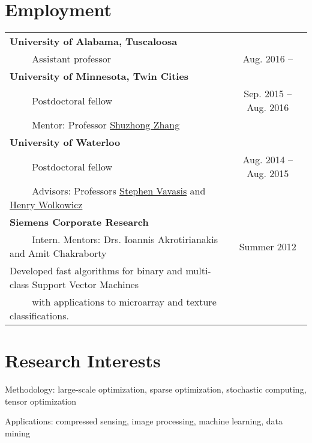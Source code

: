 \documentclass[letterpaper]{article}
\renewenvironment{itemize}{
  \begin{list}{}{
    \setlength{\leftmargin}{1.5em}
  }
}{
  \end{list}
}
\begin{document}
\section*{Employment}

\begin{minipage}{1\linewidth}
\begin{tabular}{lc}
\textbf{University of Alabama, Tuscaloosa}&\\
~~~~ Assistant professor & Aug. 2016 --\\
\textbf{University of Minnesota, Twin Cities}&\\
~~~~ Postdoctoral fellow & \hfill Sep. 2015 -- Aug. 2016\\
~~~~ Mentor: Professor \href{http://www.menet.umn.edu/~zhangs/}{Shuzhong Zhang} &\\[0.1cm]
\textbf{University of Waterloo}&\\
~~~~ Postdoctoral fellow & \hfill Aug. 2014 -- Aug. 2015\\
~~~~ Advisors: Professors \href{http://www.math.uwaterloo.ca/~vavasis/}{Stephen Vavasis} and \href{http://www.math.uwaterloo.ca/~hwolkowi/}{Henry Wolkowicz} &\\[0.1cm]
\textbf{Siemens Corporate Research} & \\
~~~~ {Intern}. Mentors: Drs. Ioannis  Akrotirianakis and Amit Chakraborty & Summer 2012 \\
 \hspace{0.5cm}Developed fast algorithms for binary and multi-class Support Vector Machines &\\
~~~~ with applications to microarray and texture classifications. & 

\end{tabular}
\end{minipage}

\section*{Research Interests}
\begin{itemize}\setlength{\itemsep}{-1pt}
\item Methodology: large-scale optimization, sparse optimization, stochastic computing, tensor optimization 
\item Applications: compressed sensing, image processing, machine learning, data mining
\end{itemize}
\end{document}
